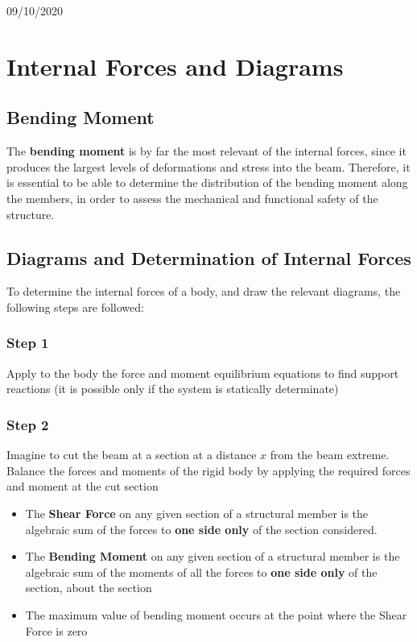 \documentclass[class=report, crop=false, 12pt,a4paper]{standalone}
\begin{document}
\begin{center}
  09/10/2020
\end{center}
\section{Internal Forces and Diagrams}
\subsection{Bending Moment}
The \textbf{bending moment}  is by far the most relevant of the internal forces, since it produces the largest levels of deformations and stress into the beam.
Therefore, it is essential to be able to determine the distribution of the bending moment along the members, in order to assess the mechanical and functional safety of the structure.
\subsection{Diagrams and Determination of Internal Forces}
To determine the internal forces of a body, and draw the relevant diagrams, the following steps are followed:
\subsubsection{Step 1}
Apply to the body the force and moment equilibrium equations to find support reactions (it is possible only if the system is statically determinate)
\subsubsection{Step 2}
Imagine to cut the beam at a section at a distance $x$ from the beam extreme. Balance the forces and moments of the rigid body by applying the required forces and moment at the cut section
\begin{itemize}[noitemsep]
  \item The \textbf{Shear Force} on any given section of a structural member is the algebraic sum of the forces to \textbf{one side only} of the section considered.
  \item The \textbf{Bending Moment} on any given section of a structural member is the algebraic sum of the moments of all the forces to \textbf{one side only} of the section, about the section
  \item The maximum value of bending moment occurs at the point where the Shear Force is zero
\end{itemize}
\end{document}
